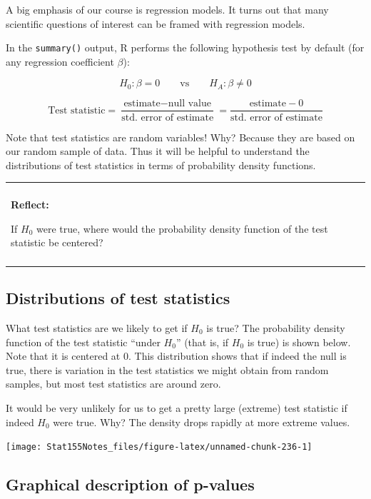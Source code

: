 \documentclass[]{book}
\newenvironment{reflect}
{
    \begin{center}
    
    \begin{tabular}{|p{0.8\textwidth}|}
    \rowcolor{LightBlue}
    \hline\\
    \rowcolor{LightBlue}
    \textbf{Reflect:}
}
{
    \\\rowcolor{LightBlue}
    \\\hline
    \end{tabular} 
    \end{center}
}
\begin{document}
A big emphasis of our course is regression models. It turns out that many scientific questions of interest can be framed with regression models.

In the \texttt{summary()} output, R performs the following hypothesis test by default (for any regression coefficient \(\beta\)):

\[H_0: \beta = 0 \qquad \text{vs} \qquad H_A: \beta \neq 0\]

\[\text{Test statistic} = \frac{\text{estimate} - \text{null value}}{\text{std. error of estimate}} = \frac{\text{estimate} - 0}{\text{std. error of estimate}} \]

Note that test statistics are random variables! Why? Because they are based on our random sample of data. Thus it will be helpful to understand the distributions of test statistics in terms of probability density functions.

\begin{reflect}
If \(H_0\) were true, where would the probability density function of
the test statistic be centered?
\end{reflect}

\hypertarget{distributions-of-test-statistics}{%
\subsection{Distributions of test statistics}\label{distributions-of-test-statistics}}

What test statistics are we likely to get if \(H_0\) is true? The probability density function of the test statistic ``under \(H_0\)'' (that is, if \(H_0\) is true) is shown below. Note that it is centered at 0. This distribution shows that if indeed the null is true, there is variation in the test statistics we might obtain from random samples, but most test statistics are around zero.

It would be very unlikely for us to get a pretty large (extreme) test statistic if indeed \(H_0\) were true. Why? The density drops rapidly at more extreme values.

\begin{center}\texttt{[image: Stat155Notes\_files/figure-latex/unnamed-chunk-236-1]} \end{center}

\hypertarget{graphical-description-of-p-values}{%
\subsection{Graphical description of p-values}\label{graphical-description-of-p-values}}
\end{document}
